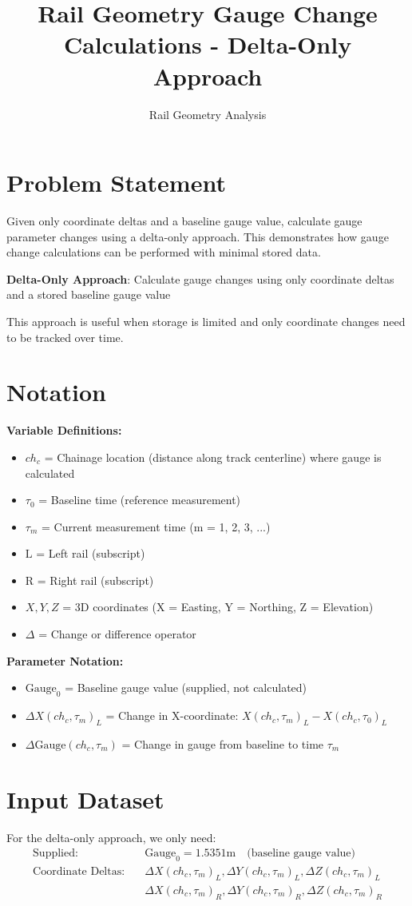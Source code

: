 \documentclass{article}
\title{Rail Geometry Gauge Change Calculations - Delta-Only Approach}
\author{Rail Geometry Analysis}
\date{}
\begin{document}
\maketitle

\section{Problem Statement}
Given only coordinate deltas and a baseline gauge value, calculate gauge parameter changes using a delta-only approach. This demonstrates how gauge change calculations can be performed with minimal stored data.

\textbf{Delta-Only Approach}: Calculate gauge changes using only coordinate deltas and a stored baseline gauge value

This approach is useful when storage is limited and only coordinate changes need to be tracked over time.

\section{Notation}
\textbf{Variable Definitions:}
\begin{itemize}
\item $ch_c$ = Chainage location (distance along track centerline) where gauge is calculated
\item $\tau_0$ = Baseline time (reference measurement)
\item $\tau_m$ = Current measurement time (m = 1, 2, 3, ...)
\item $\text{L}$ = Left rail (subscript)
\item $\text{R}$ = Right rail (subscript)
\item $X, Y, Z$ = 3D coordinates (X = Easting, Y = Northing, Z = Elevation)
\item $\Delta$ = Change or difference operator
\end{itemize}

\textbf{Parameter Notation:}
\begin{itemize}
\item $\text{Gauge}_0$ = Baseline gauge value (supplied, not calculated)
\item $\Delta X(ch_c, \tau_m)_L$ = Change in X-coordinate: $X(ch_c, \tau_m)_L - X(ch_c, \tau_0)_L$
\item $\Delta\text{Gauge}(ch_c, \tau_m)$ = Change in gauge from baseline to time $\tau_m$
\end{itemize}

\section{Input Dataset}
For the delta-only approach, we only need:
\begin{align}
\text{Supplied:} \quad &\text{Gauge}_0 = 1.5351\text{m} \quad \text{(baseline gauge value)} \\[0.5em]
\text{Coordinate Deltas:} \quad &\Delta X(ch_c, \tau_m)_L, \Delta Y(ch_c, \tau_m)_L, \Delta Z(ch_c, \tau_m)_L \\
&\Delta X(ch_c, \tau_m)_R, \Delta Y(ch_c, \tau_m)_R, \Delta Z(ch_c, \tau_m)_R
\end{align}
\end{document}
